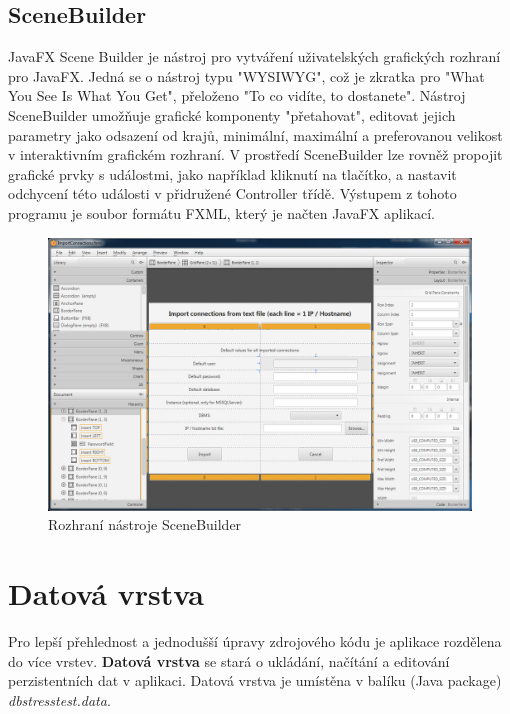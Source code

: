 \documentclass[czech,bachelor,public,dept460,male,cpdeclaration,twoside]{diploma}
\begin{document}
\subsection{SceneBuilder}
JavaFX Scene Builder je nástroj pro vytváření uživatelských grafických rozhraní pro JavaFX. Jedná se o nástroj typu "WYSIWYG", což je zkratka pro "What You See Is What You Get", přeloženo "To co vidíte, to dostanete". Nástroj SceneBuilder umožňuje grafické komponenty "přetahovat", editovat jejich parametry jako odsazení od krajů, minimální, maximální a preferovanou velikost v interaktivním grafickém rozhraní. V prostředí SceneBuilder lze rovněž propojit grafické prvky s událostmi, jako například kliknutí na tlačítko, a nastavit odchycení této události v přidružené Controller třídě. Výstupem z tohoto programu je soubor formátu FXML, který je načten JavaFX aplikací.
\cite{scenebuilder}

\begin{figure}[!h]\centering\includegraphics[width=1.0\textwidth]{Figures/SceneBuilder.png}\caption{Rozhraní nástroje SceneBuilder}
\end{figure}


\section{Datová vrstva} \label{datalayer}
Pro lepší přehlednost a jednodušší úpravy zdrojového kódu je aplikace rozdělena do více vrstev. \textbf{Datová vrstva} se stará o ukládání, načítání a editování perzistentních dat v aplikaci. Datová vrstva je umístěna v balíku (Java package) \textit{dbstresstest.data}.
\end{document}
